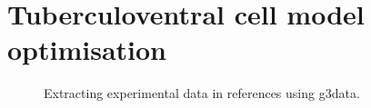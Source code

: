  \newpage
%



\section[TV cell]{Tuberculoventral cell model optimisation}


\begin{figure}[htb]
\begin{center}
\caption{Extracting experimental data in references using g3data.}
\label{fig:Extractdata}
\end{center}
\end{figure}

